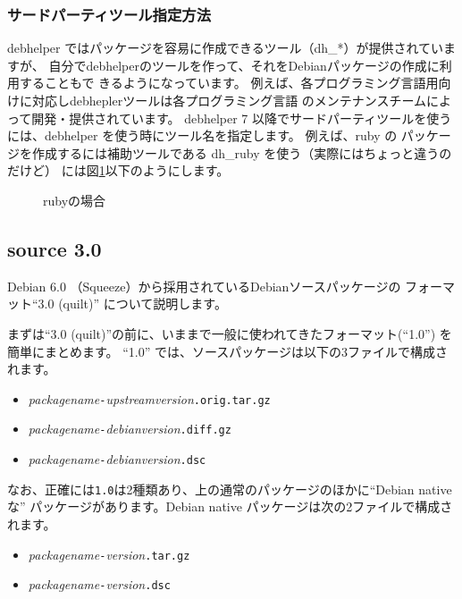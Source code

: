 \documentclass[mingoth,a4paper]{jsarticle}
\begin{document}
\subsubsection{サードパーティツール指定方法}

debhelper ではパッケージを容易に作成できるツール（dh\_*）が提供されていますが、
自分でdebhelperのツールを作って、それをDebianパッケージの作成に利用することもで
きるようになっています。
例えば、各プログラミング言語用向けに対応しdebheplerツールは各プログラミング言語
のメンテナンスチームによって開発・提供されています。
debhelper 7 以降でサードパーティツールを使うには、debhelper を使う時にツール名を指定します。
例えば、ruby の パッケージを作成するには補助ツールである dh\_ruby を使う（実際にはちょっと違うのだけど）
には図\ref{fig:ruby_setting}以下のようにします。

\begin{figure}[h]

\caption{rubyの場合}
\label{fig:ruby_setting}
\end{figure}

\enlargethispage{5mm}
\subsection{source 3.0}

Debian 6.0 （Squeeze）から採用されているDebianソースパッケージの
フォーマット``3.0 (quilt)'' について説明します。

まずは``3.0 (quilt)''の前に、いままで一般に使われてきたフォーマット(``1.0'')
を簡単にまとめます。
``1.0'' では、ソースパッケージは以下の3ファイルで構成されます。
\begin{itemize}
 \item \textit{packagename}\verb|-|\textit{upstreamversion}\verb|.orig.tar.gz|
 \item \textit{packagename}\verb|-|\textit{debianversion}\verb|.diff.gz|
 \item \textit{packagename}\verb|-|\textit{debianversion}\verb|.dsc|
\end{itemize}

なお、正確には\verb|1.0|は2種類あり、上の通常のパッケージのほかに``Debian   
nativeな'' パッケージがあります。Debian native パッケージは次の2ファイルで構成されます。
\begin{itemize}
 \item \textit{packagename}\verb|-|\textit{version}\verb|.tar.gz|
 \item \textit{packagename}\verb|-|\textit{version}\verb|.dsc|
\end{itemize}
\end{document}
